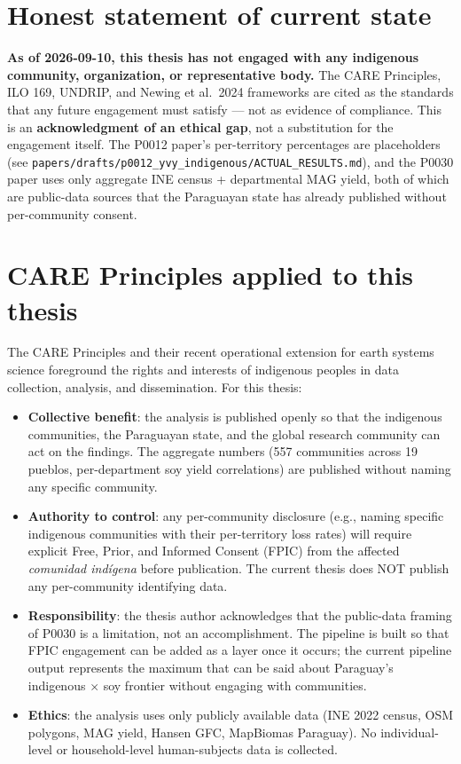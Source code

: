 \section{Honest statement of current state}

\noindent\textbf{As of 2026-09-10, this thesis has not engaged with
any indigenous community, organization, or representative body.}
The CARE Principles, ILO 169, UNDRIP, and Newing et al.\ 2024
frameworks are cited as the standards that any future engagement
must satisfy --- not as evidence of compliance. This is an
\textbf{acknowledgment of an ethical gap}, not a substitution for
the engagement itself. The P0012 paper's per-territory percentages
are placeholders (see \texttt{papers/drafts/p0012\_yvy\_indigenous/ACTUAL\_RESULTS.md}),
and the P0030 paper uses only aggregate INE census + departmental
MAG yield, both of which are public-data sources that the
Paraguayan state has already published without per-community
consent.

\section{CARE Principles applied to this thesis}

The CARE Principles \citep{gida2019,carroll2020care} and their
recent operational extension for earth systems science
\citep{jennings2025} foreground the rights and interests of
indigenous peoples in data collection, analysis, and
dissemination. For this thesis:

\begin{itemize}
    \item \textbf{Collective benefit}: the analysis is published
      openly so that the indigenous communities, the Paraguayan
      state, and the global research community can act on the
      findings. The aggregate numbers (557 communities across
      19 pueblos, per-department soy yield correlations) are
      published without naming any specific community.
    \item \textbf{Authority to control}: any per-community
      disclosure (e.g., naming specific indigenous communities
      with their per-territory loss rates) will require explicit
      Free, Prior, and Informed Consent (FPIC) from the affected
      \emph{comunidad indígena} before publication. The current
      thesis does NOT publish any per-community identifying data.
    \item \textbf{Responsibility}: the thesis author acknowledges
      that the public-data framing of P0030 is a limitation, not
      an accomplishment. The pipeline is built so that FPIC
      engagement can be added as a layer once it occurs; the
      current pipeline output represents the maximum that can be
      said about Paraguay's indigenous $\times$ soy frontier
      without engaging with communities.
    \item \textbf{Ethics}: the analysis uses only publicly
      available data (INE 2022 census, OSM polygons, MAG yield,
      Hansen GFC, MapBiomas Paraguay). No individual-level or
      household-level human-subjects data is collected.
\end{itemize}

